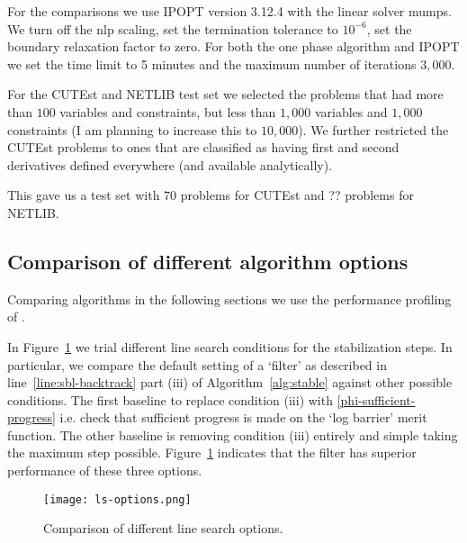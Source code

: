 \documentclass{article}
\begin{document}
For the comparisons we use IPOPT version 3.12.4 with the linear solver mumps. We turn off the nlp scaling, set the termination tolerance to $10^{-6}$, set the boundary relaxation factor to zero. For both the one phase algorithm and IPOPT we set the time limit to 5 minutes and the maximum number of iterations $3,000$.

For the CUTEst and NETLIB test set we selected the problems that had more than $100$ variables and constraints, but less than $1,000$ variables and $1,000$ constraints (I am planning to increase this to $10,000$). We further restricted the CUTEst problems to ones that are classified as having first and second derivatives defined everywhere (and available analytically).

This gave us a test set with $70$ problems for CUTEst and ?? problems for NETLIB.

\subsection{Comparison of different algorithm options}\label{alg:comparison-options}

Comparing algorithms in the following sections we use the performance profiling of \cite{dolan2002benchmarking}.



In Figure~\ref{fig:ls-options} we trial different line search conditions for the stabilization steps. In particular, we compare the default setting of a `filter' as described in line~\eqref{line:sbl-backtrack} part (iii) of Algorithm~\ref{alg:stable} against other possible conditions. The first baseline to replace condition (iii) with  \eqref{phi-sufficient-progress} i.e. check that sufficient progress is made on the `log barrier' merit function. The other baseline is removing condition (iii) entirely and simple taking the maximum step possible. Figure~\ref{fig:ls-options} indicates that the filter has superior performance of these three options.

\begin{figure}[H]
\texttt{[image: ls-options.png]}
\caption{Comparison of different line search options.}\label{fig:ls-options}
\end{figure}
\end{document}
